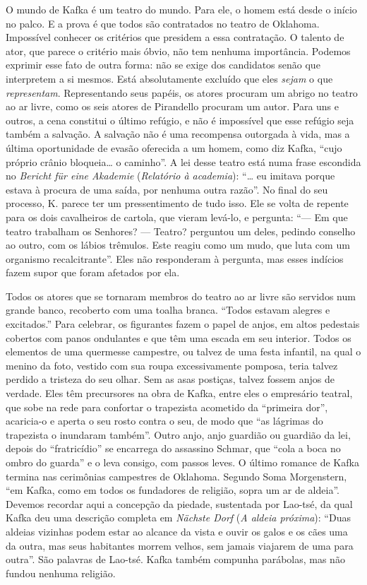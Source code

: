 O mundo de Kafka é um teatro do mundo. Para ele, o homem está desde o
início no palco. E a prova é que todos são contratados no teatro de
Oklahoma. Impossível conhecer os critérios que presidem a essa
contratação. O talento de ator, que parece o critério mais óbvio, não
tem nenhuma importância. Podemos exprimir esse fato de outra forma: não
se exige dos candidatos senão que interpretem a si mesmos. Está
absolutamente excluído que eles \textit{sejam} o que \textit{representam}.
Representando seus papéis, os atores procuram um abrigo no teatro ao ar
livre, como os seis atores de Pirandello procuram um autor. Para uns e
outros, a cena constitui o último refúgio, e não é impossível que esse
refúgio seja também a salvação. A salvação não é uma recompensa
outorgada à vida, mas a última oportunidade de evasão oferecida a um
homem, como diz Kafka, ``cujo próprio crânio bloqueia\ldots{} o caminho''. A
lei desse teatro está numa frase escondida no \textit{Bericht für eine
Akademie} (\textit{Relatório à academia}): ``\ldots{} eu imitava porque estava à
procura de uma saída, por nenhuma outra razão''. No final do seu
processo, K. parece ter um pressentimento de tudo isso. Ele se volta de
repente para os dois cavalheiros de cartola, que vieram levá-lo, e
pergunta: ``--- Em que teatro trabalham os Senhores? --- Teatro?
perguntou um deles, pedindo conselho ao outro, com os lábios trêmulos.
Este reagiu como um mudo, que luta com um organismo recalcitrante''.
Eles não responderam à pergunta, mas esses indícios fazem supor que
foram afetados por ela.

Todos os atores que se tornaram membros do teatro ao ar livre são
servidos num grande banco, recoberto com uma toalha branca. ``Todos
estavam alegres e excitados.'' Para celebrar, os figurantes fazem o
papel de anjos, em altos pedestais cobertos com panos ondulantes e que
têm uma escada em seu interior. Todos os elementos de uma quermesse
campestre, ou talvez de uma festa infantil, na qual o menino da foto,
vestido com sua roupa excessivamente pomposa, teria talvez perdido a
tristeza do seu olhar. Sem as asas postiças, talvez fossem anjos de
verdade. Eles têm precursores na obra de Kafka, entre eles o empresário
teatral, que sobe na rede para confortar o trapezista acometido da
``primeira dor'', acaricia-o e aperta o seu rosto contra o seu, de modo
que ``as lágrimas do trapezista o inundaram também''. Outro anjo, anjo
guardião ou guardião da lei, depois do ``fratricídio'' se encarrega do
assassino Schmar, que ``cola a boca no ombro do guarda'' e o leva
consigo, com passos leves. O último romance de Kafka termina nas
cerimônias campestres de Oklahoma. Segundo Soma Morgenstern, ``em Kafka,
como em todos os fundadores de religião, sopra um ar de aldeia''.
Devemos recordar aqui a concepção da piedade, sustentada por Lao-tsé, da
qual Kafka deu uma descrição completa em \textit{Nächste Dorf} (\textit{A aldeia
próxima}): ``Duas aldeias vizinhas podem estar ao alcance da vista e
ouvir os galos e os cães uma da outra, mas seus habitantes morrem
velhos, sem jamais viajarem de uma para outra''. São palavras de
Lao-tsé. Kafka também compunha parábolas, mas não fundou nenhuma
religião.

